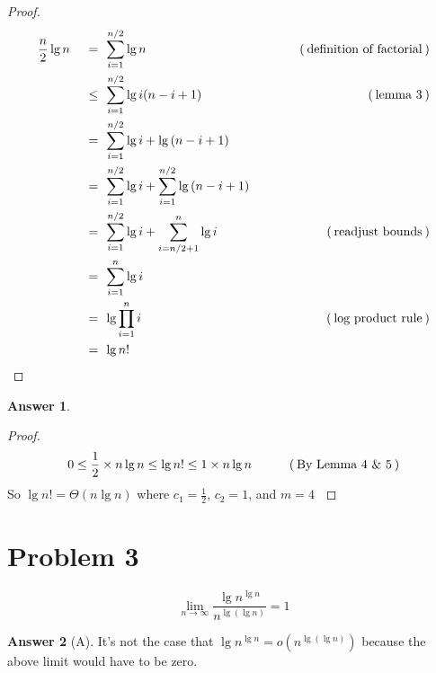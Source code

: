 \documentclass{article}
\theoremstyle{definition}
\newtheorem*{answer}{Answer}
\newcommand{\evidence}[1]{\ensuremath{\hspace{3em} (\hspace{0.2em} \text{#1} \hspace{0.2em})}}
\newcommand{\asymptotic}[3]{\ensuremath{#2 = #1(#3)}}
\newcommand{\littleO}[2]{\asymptotic{o}{#1}{#2}}
\newcommand{\bigTheta}[2]{\asymptotic{\Theta}{#1}{#2}}
\newcommand{\relation}[1]{\ensuremath{\hspace{0.2em} {{} #1 {}} \hspace{0.2em}}}
\newcommand{\equal}{\relation{=}}
\newcommand{\lesseq}{\relation{\le}}
\newcommand{\parens}[1]{\left(#1\right)}
\newcommand{\lglg}[1]{\ensuremath{\lg{\parens{\lg{#1}}}}}
\begin{document}
\begin{proof}
  \hfill
  \begin{alignat*}{4}
    & \frac{n}{2}\lg{n} & \equal  & \sum_{i=1}^{n/2}{\lg{n}}            & \evidence{definition of factorial} \\
    & {}                & \lesseq & \sum_{i=1}^{n/2}{\lg{i(n - i + 1)}} & \evidence{lemma 3} \\
    & {}                & \equal  & \sum_{i=1}^{n/2}{\lg{i} + \lg{(n - i + 1)}} & {} \\
    & {}                & \equal  & \sum_{i=1}^{n/2}{\lg{i}} + \sum_{i=1}^{n/2}{\lg{(n - i + 1)}} & {} \\
    & {}                & \equal  & \sum_{i=1}^{n/2}{\lg{i}} + \sum_{i=n/2 + 1}^{n}{\lg{i}} & \evidence{readjust bounds} \\
    & {}                & \equal  & \sum_{i=1}^{n}{\lg{i}}   & {} \\
    & {}                & \equal  & \lg{\prod_{i=1}^{n}{i}}  & \evidence{log product rule} \\
    & {}                & \equal  & \lg{n!}                 & \qedhere
  \end{alignat*}
\end{proof}

\begin{answer}
  \hfill
  \begin{proof}
    \vspace{1em}
    \begin{equation*}
      0 \le \frac{1}{2} \times n \lg{n} \le \lg{n!} \le 1 \times n\lg{n} \evidence{By Lemma 4 $\&$ 5}
    \end{equation*}
    So $\bigTheta{\lg{n!}}{n\lg{n}}$ where $c_1 = \frac{1}{2}$, $c_2 = 1$, and $m = 4$ $\qedhere$ 
  \end{proof}
\end{answer}



\section*{Problem 3}

\begin{equation*}
  \lim_{n \rightarrow \infty}{\frac{\lg{n}^{\lg{n}}}{n^{\lglg{n}}}} = 1
\end{equation*}

\vspace{0.5em}

\begin{answer}[A]
  It's not the case that $\littleO{\lg{n}^{\lg{n}}}{n^{\lglg{n}}}$
  because the above limit would have to be zero.
\end{answer}
\end{document}
